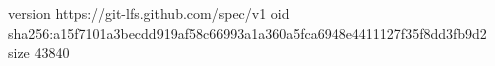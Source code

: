 version https://git-lfs.github.com/spec/v1
oid sha256:a15f7101a3becdd919af58c66993a1a360a5fca6948e4411127f35f8dd3fb9d2
size 43840
